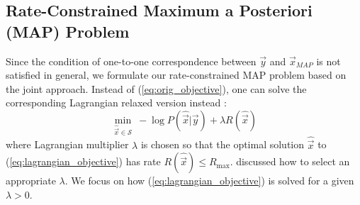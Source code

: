 

\subsection{Rate-Constrained Maximum a Posteriori (MAP) Problem}
\label{subsec:analysis_formulation}

Since the condition of one-to-one correspondence between $\vec{y}$ and $\vec{x}_{MAP}$ is not satisfied in general, we formulate our rate-constrained MAP problem based on the joint approach. 
Instead of (\ref{eq:orig_objective}), one can solve the corresponding Lagrangian relaxed version instead \cite{shoham88}:
\begin{equation}
\label{eq:lagrangian_objective}
\underset{\hat{\vec{x}}\in  \mathcal{S}}{\min}\ -\log P(\hat{\vec{x}}|\vec{y})+\lambda R(\hat{\vec{x}})
\end{equation}
where Lagrangian multiplier $\lambda$ is chosen so that the optimal solution $\hat{\vec{x}}$ to (\ref{eq:lagrangian_objective}) has rate $R(\hat{\vec{x}}) \leq R_{\max}$.
\cite{shoham88,abreu16arxiv} discussed how to select an appropriate $\lambda$.
We focus on how (\ref{eq:lagrangian_objective}) is solved for a given $\lambda > 0$.

